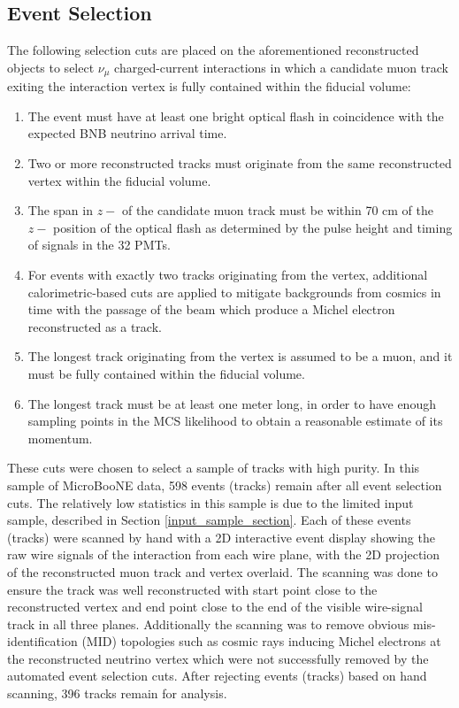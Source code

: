 \documentclass[a4paper,11pt]{article}
\begin{document}
\subsection{Event Selection}
The following selection cuts are placed on the aforementioned reconstructed objects to select $\nu_\mu$ charged-current interactions in which a candidate muon track exiting the interaction vertex is fully contained within the fiducial volume:
\begin{enumerate}
\item The event must have at least one bright optical flash in coincidence with the expected BNB neutrino arrival time.
\item Two or more reconstructed tracks must originate from the same reconstructed vertex within the fiducial volume.
\item The span in $z-$ of the candidate muon track must be within 70 cm of the $z-$ position of the optical flash as determined by the pulse height and timing of signals in the 32 PMTs.
\item For events with exactly two tracks originating from the vertex, additional calorimetric-based cuts are applied to mitigate backgrounds from cosmics in time with the passage of the beam which produce a Michel electron reconstructed as a track.
\item The longest track originating from the vertex is assumed to be a muon, and it must be fully contained within the fiducial volume.
\item The longest track must be at least one meter long, in order to have enough sampling points in the MCS likelihood to obtain a reasonable estimate of its momentum.
\end{enumerate}

These cuts were chosen to select a sample of tracks with high purity. In this sample of MicroBooNE data, 598 events (tracks) remain after all event selection cuts. The relatively low statistics in this sample is due to the limited input sample, described in Section \ref{input_sample_section}. Each of these events (tracks) were scanned by hand with a 2D interactive event display showing the raw wire signals of the interaction from each wire plane, with the 2D projection of the reconstructed muon track and vertex overlaid. The scanning was done to ensure the track was well reconstructed with start point close to the reconstructed vertex and end point close to the end of the visible wire-signal track in all three planes. Additionally the scanning was to remove obvious mis-identification (MID) topologies such as cosmic rays inducing Michel electrons at the reconstructed neutrino vertex which were not successfully removed by the automated event selection cuts. After rejecting events (tracks) based on hand scanning, 396 tracks remain for analysis.
\end{document}
